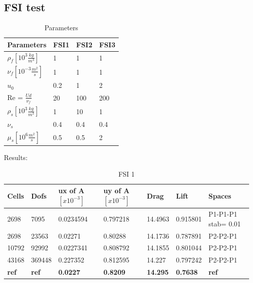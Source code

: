 \subsection*{FSI test}
\begin{table}[ht]
\centering
\caption{Parameters}
\label{my-label}
\begin{tabular}{|l|l|l|l|}
\hline
Parameters & FSI1 & FSI2 & FSI3 \\ \hline
$\rho_f[10^3 \frac{kg}{m^3}]$ & 1 & 1 & 1 \\ \hline
$\nu_f [10^{-3} \frac{m^2}{s}]$ & 1 & 1 & 1 \\ \hline
$u_0$ & 0.2 & 1 & 2 \\ \hline
Re = $\frac{U d}{\nu_f}$ & 20 & 100 & 200 \\ \hline
$\rho_s[10^3 \frac{kg}{m^3}]$ & 1 & 10 & 1 \\ \hline
$\nu_s$ & 0.4 & 0.4 & 0.4 \\ \hline
$\mu_s[10^6 \frac{m^2}{s}]$ & 0.5 & 0.5 & 2 \\ \hline
\end{tabular}
\end{table}
Results: 
\begin{table}[h]
\centering
\caption{FSI 1}
\label{my-label}
\begin{tabular}{|l|l|l|l|l|l|l|}
\hline
Cells & Dofs & ux of A $[x10^{-3}]$ & uy of A $[x10^{-3}]$ & Drag & Lift & Spaces \\ \hline
2698 & 7095 & 0.0234594 & 0.797218  & 14.4963 & 0.915801 & P1-P1-P1 stab= 0.01 \\ \hline
2698 & 23563 & 0.02271 & 0.80288 & 14.1736 & 0.787891 & P2-P2-P1 \\ \hline
10792 & 92992 & 0.0227341 & 0.808792 & 14.1855 & 0.801044 & P2-P2-P1 \\ \hline
43168 & 369448 & 0.227352 & 0.812595 & 14.227 & 0.797242 & P2-P2-P1 \\ \hline
\textbf{ref} & \textbf{ref} & \textbf{0.0227} & \textbf{0.8209} & \textbf{14.295} & \textbf{0.7638} & \textbf{ref} \\ \hline
\end{tabular}
\end{table}



